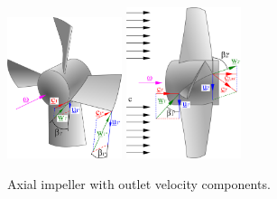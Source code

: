 \begin{figure}[ht]
\begin{center}
\includegraphics[width=0.3\textwidth]{figs/AxialPump_axon.png}
\hspace{1cm}
\includegraphics[width=0.3\textwidth]{figs/AxialPump_side.png}
\caption{\label{fig:axial_machines}Axial impeller with outlet velocity components.}
\end{center}
\end{figure}

%
%
%

